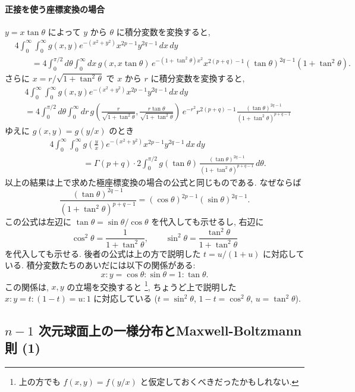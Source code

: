 \documentclass[12pt,twoside]{jarticle}
\theoremstyle{jplain}
\theoremstyle{jplain}
\theoremstyle{jplain}
\numberwithin{theorem}{section}
\numberwithin{equation}{section}
\numberwithin{figure}{section}
\numberwithin{table}{section}
\begin{document}
\paragraph{正接を使う座標変換の場合}
$y=x\tan\theta$ によって $y$ から $\theta$ に積分変数を変換すると,
\begin{align*}
&
4\int_0^\infty\int_0^\infty g(x,y)e^{-(x^2+y^2)}x^{2p-1}y^{2q-1}\,dx\,dy
\\ & \qquad
=
4\int_0^{\pi/2}d\theta\int_0^\infty dx\, 
g(x,x\tan\theta)\,e^{-(1+\tan^2\theta)x^2}x^{2(p+q)-1} 
(\tan\theta)^{2q-1}(1+\tan^2\theta).
\end{align*}
さらに $x=r/\sqrt{1+\tan^2\theta}$ で $x$ から $r$ に積分変数を変換すると,
\begin{align*}
&
4\int_0^\infty\int_0^\infty g(x,y)e^{-(x^2+y^2)}x^{2p-1}y^{2q-1}\,dx\,dy
\\ &
=
4\int_0^{\pi/2}d\theta\int_0^\infty dr\, 
g\left(\frac{r}{\sqrt{1+\tan^2\theta}},\frac{r\tan\theta}{\sqrt{1+\tan^2\theta}}\right)\,
e^{-r^2}r^{2(p+q)-1} 
\frac{(\tan\theta)^{2q-1}}{(1+\tan^2\theta)^{p+q-1}}
\end{align*}
ゆえに $g(x,y)=g(y/x)$ のとき
\begin{align*}
&
4\int_0^\infty\int_0^\infty g\left(\frac{y}{x}\right)e^{-(x^2+y^2)}x^{2p-1}y^{2q-1}\,dx\,dy
\\ & \qquad\qquad
=
\Gamma(p+q)\cdot
2\int_0^{\pi/2} g(\tan\theta)\,\frac{(\tan\theta)^{2q-1}}{(1+\tan^2\theta)^{p+q-1}}\,d\theta.
\end{align*}
以上の結果は上で求めた極座標変換の場合の公式と同じものである. なぜならば
\[
\frac{(\tan\theta)^{2q-1}}{(1+\tan^2\theta)^{p+q-1}}
=
(\cos\theta)^{2p-1}(\sin\theta)^{2q-1}.
\]
この公式は左辺に $\tan\theta=\sin\theta/\cos\theta$ を代入しても示せるし, 
右辺に
\[
\cos^2\theta=\frac{1}{1+\tan^2\theta}, \qquad
\sin^2\theta=\frac{\tan^2\theta}{1+\tan^2\theta}
\]
を代入しても示せる. 後者の公式は上の方で説明した $t=u/(1+u)$ に対応している.
積分変数たちのあいだには以下の関係がある:
\[
x:y = \cos\theta:\sin\theta = 1:\tan\theta.
\]
この関係は, $x,y$ の立場を交換すると%
\footnote{上の方でも $f(x,y)=f(y/x)$ と仮定しておくべきだったかもしれない.}, 
ちょうど上で説明した $x:y=t:(1-t)=u:1$ に対応している
($t=\sin^2\theta$, $1-t=\cos^2\theta$, $u=\tan^2\theta$).


\subsection{$n-1$ 次元球面上の一様分布とMaxwell-Boltzmann則 (1)}
\label{sec:MB1}
\end{document}
